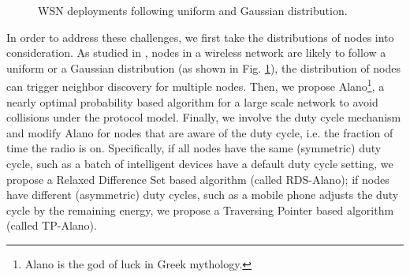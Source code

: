 \begin{figure}[!t]
\centering
{}
\vspace{0.03in}
\caption{WSN deployments following uniform and Gaussian distribution.}
\label{distribution}
\end{figure}


In order to address these challenges, we first take the distributions of nodes into consideration. As studied in \cite{wang2013gaussian}, nodes in a wireless network are likely to follow a uniform or a Gaussian distribution (as shown in Fig. \ref{distribution}), the distribution of nodes can trigger neighbor discovery for multiple nodes. Then, we propose Alano\footnote{Alano is the god of luck in Greek mythology.}, a nearly optimal probability based algorithm for a large scale network to avoid collisions under the protocol model. Finally, we involve the duty cycle mechanism and modify Alano for nodes that are aware of the duty cycle, i.e. the fraction of time the radio is on. Specifically, if all nodes have the same (symmetric) duty cycle, such as a batch of intelligent devices have a default duty cycle setting, we propose a Relaxed Difference Set based algorithm (called RDS-Alano); if nodes have different (asymmetric) duty cycles, such as a mobile phone adjusts the duty cycle by the remaining energy, we propose a Traversing Pointer based algorithm (called TP-Alano).

